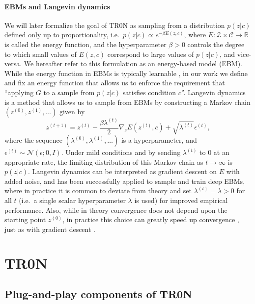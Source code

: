\documentclass[nohyperref]{article}
\theoremstyle{plain}
\theoremstyle{definition}
\theoremstyle{remark}
\begin{document}
\paragraph{EBMs and Langevin dynamics} We will later formalize the goal of TR0N as sampling from a distribution $p(z|c)$ defined only up to proportionality, i.e.\ $p(z|c) \propto e^{-\beta E(z,c)}$, where $E:\mathcal{Z} \times \mathcal{C} \rightarrow \mathbb{R}$ is called the energy function, and the hyperparameter $\beta > 0$ controls the degree to which small values of $E(z,c)$ correspond to large values of $p(z|c)$, and vice-versa. We hereafter refer to this formulation as an energy-based model (EBM). While the energy function in EBMs is typically learnable \citep{xie2016theory,du2019implicit}, in our work we define and fix an energy function that allows us to enforce the requirement that ``applying $G$ to a sample from $p(z|c)$ satisfies condition $c$''. 
Langevin dynamics is a method that allows us to sample from EBMs by constructing a Markov chain $(z^{(0)}, z^{(1)}, \dots)$ given by
\begin{equation}\label{eq:langevin_dynamics}
    z^{(t+1)} = z^{(t)} - \dfrac{\beta \lambda^{(t)}}{2} \nabla_z E\left(z^{(t)}, c\right) + \sqrt{\lambda^{(t)}}\epsilon^{(t)},
\end{equation}
where the sequence $(\lambda^{(0)}, \lambda^{(1)}, \dots)$ is a hyperparameter, and $\epsilon^{(t)} \sim \mathcal{N}(\epsilon; 0, I)$. Under mild conditions and by sending $\lambda^{(t)}$ to $0$ at an appropriate rate, 
the limiting distribution of this Markov chain as $t\to\infty$ is $p(z|c)$. 
Langevin dynamics can be interpreted as gradient descent on $E$ with added noise, and has been successfully applied to sample and train deep EBMs, where in practice it is common to deviate from theory and set $\lambda^{(t)} = \lambda > 0$ for all $t$ (i.e.\ a single scalar hyperparameter $\lambda$ is used) for improved empirical performance. 
Also, while in theory convergence does not depend upon the starting point $z^{(0)}$, in practice this choice can greatly speed up convergence \citep{hinton2002training, nijkamp2020anatomy, yoon2021autoencoding}, just as with gradient descent \citep{boyd2004convex, glorot2010understanding}.
 
\section{TR0N}
\subsection{Plug-and-play components of TR0N}
\end{document}
